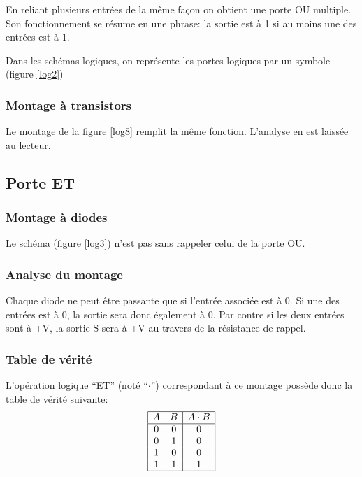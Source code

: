 En reliant plusieurs entr\'ees de la m\^eme fa\c{c}on on obtient 
une porte OU multiple. Son fonctionnement se r\'esume en une phrase:
la sortie est \`a 1 si au moins une des entr\'ees est \`a 1.

Dans les sch\'emas logiques, on repr\'esente les portes logiques
par un symbole (figure \ref{log2})


\subsubsection{Montage \`a transistors}

Le montage de la figure \ref{log8} remplit la m\^eme fonction. L'analyse
en est laiss\'ee au lecteur.



\subsection{Porte ET}

\subsubsection{Montage \`a diodes}

Le sch\'ema (figure \ref{log3}) n'est pas sans rappeler celui de la porte OU.


\subsubsection{Analyse du montage}

Chaque diode ne peut \^etre passante que si l'entr\'ee associ\'ee
est \`a 0. Si une des entr\'ees est \`a 0, la sortie sera donc \'egalement \`a 
0.  Par contre si les deux entr\'ees sont \`a +V, la sortie S sera \`a +V
au travers de la r\'esistance de rappel.

\subsubsection{Table de v\'erit\'e}

L'op\'eration logique ``ET'' (not\'e ``$\cdot$'') correspondant 
\`a ce montage poss\`ede donc la table de v\'erit\'e suivante:
$$ \begin{array}{|cc|c|}
\hline
A & B & A \cdot B \\
\hline
0 & 0 & 0 \\
0 & 1 & 0 \\
1 & 0 & 0 \\
1 & 1 & 1 \\
\hline
\end{array} $$

